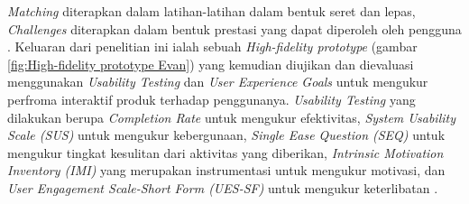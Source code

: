 \textit{Matching} diterapkan dalam latihan-latihan dalam bentuk seret dan lepas,
\textit{Challenges} diterapkan dalam bentuk prestasi yang dapat diperoleh oleh pengguna \cite{GamificationInProgLang}.
Keluaran dari penelitian ini ialah sebuah \textit{High-fidelity prototype} (gambar \ref*{fig:High-fidelity prototype Evan}) yang kemudian diujikan dan dievaluasi menggunakan \textit{Usability Testing} dan \textit{User Experience Goals} untuk mengukur perfroma interaktif produk terhadap penggunanya.
\textit{Usability Testing} yang dilakukan berupa \textit{Completion Rate} untuk mengukur efektivitas, \textit{System Usability Scale (SUS)} untuk mengukur kebergunaan,
\textit{Single Ease Question (SEQ)} untuk mengukur tingkat kesulitan dari aktivitas yang diberikan, \textit{Intrinsic Motivation Inventory (IMI)} yang merupakan instrumentasi untuk mengukur motivasi,
dan \textit{User Engagement Scale-Short Form (UES-SF)} untuk mengukur keterlibatan \cite{GamificationInProgLang}.

